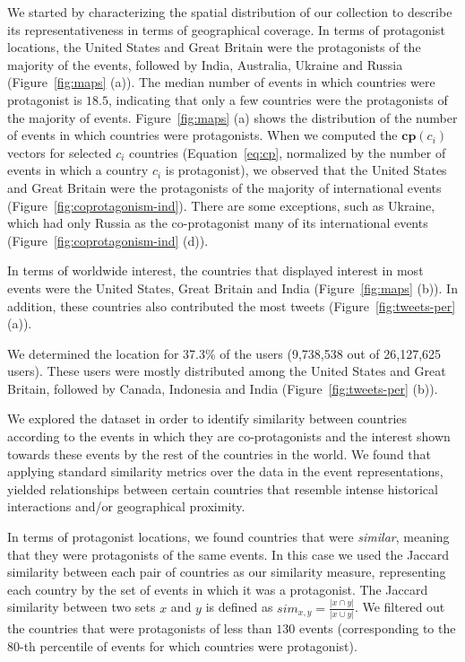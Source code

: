 We started by characterizing the spatial distribution of our collection to
describe its representativeness in terms of geographical coverage. 
%
In terms of protagonist locations, the United States and Great Britain were the
protagonists of the majority of the events, followed by India, Australia,
Ukraine and Russia (Figure~\ref{fig:maps} (a)). 
%
The median number of events in which countries were protagonist is $18.5$,
indicating that only a few countries were the protagonists of the majority of
events. 
%
Figure~\ref{fig:maps} (a) shows the distribution of the number of events in
which countries were protagonists. 
%
When we computed the $\mathbf{cp}(c_i)$ vectors for selected $c_i$ countries
(Equation~\ref{eq:cp}, normalized by the number of events in which a country
$c_i$ is protagonist), we observed that the United States and Great Britain were
the protagonists of the majority of international events
(Figure~\ref{fig:coprotagonism-ind}). 
%
There are some exceptions, such as Ukraine, which had only Russia as the
co-protagonist many of its international events
(Figure~\ref{fig:coprotagonism-ind} (d)).


In terms of worldwide interest, the countries that displayed interest in most
events were the United States, Great Britain and India (Figure~\ref{fig:maps}
(b)).  
%
In addition, these countries also contributed the most tweets
(Figure~\ref{fig:tweets-per} (a)).

We determined the location for 37.3\% of the users (9,738,538 out of 26,127,625
users). 
%
These users were mostly distributed among the United States and Great Britain,
followed by Canada, Indonesia and India (Figure~\ref{fig:tweets-per} (b)).

\medskip
{}
We explored the dataset in order to identify similarity between countries
according to the events in which they are co-protagonists and the interest shown
towards these events by the rest of the countries in the world. 
%
We found that applying standard similarity metrics over the data in the event
representations, yielded relationships between certain countries that resemble
intense historical interactions and/or geographical proximity.

In terms of protagonist locations, we found countries that were {\em similar},
meaning that they were protagonists of the same events. 
%
In this case we used the Jaccard similarity between each pair of countries as
our similarity measure, representing each country by the set of events in which
it was a protagonist. 
%
The Jaccard similarity between two sets $x$ and $y$ is defined as $sim_{x, y} =
\frac{|x \cap y|}{|x \cup y|}$.
%
We filtered out the countries that were protagonists of less than $130$ events
(corresponding to the 80-th percentile of events for which countries were
protagonist). \\

